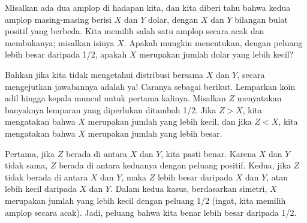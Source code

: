 \begin{example}\label{exam 4.3.6}
Misalkan ada dua amplop di hadapan kita, dan kita diberi tahu bahwa
kedua amplop masing-masing berisi $X$ dan $Y$ dolar, dengan $X$ dan $Y$ bilangan bulat
positif yang berbeda.  Kita memilih salah satu amplop secara acak dan membukanya;
misalkan isinya $X$.  Apakah mungkin menentukan, dengan peluang lebih besar daripada
1/2, apakah $X$ merupakan jumlah dolar yang lebih kecil?
\par
Bahkan jika kita tidak mengetahui distribusi bersama $X$ dan $Y$, secara mengejutkan
jawabannya adalah ya!  Caranya sebagai berikut.  Lemparkan koin adil hingga kepala
muncul untuk pertama kalinya.  Misalkan $Z$ menyatakan banyaknya lemparan yang
diperlukan ditambah 1/2.  Jika $Z > X$, kita mengatakan bahwa $X$ merupakan jumlah
yang lebih kecil, dan jika $Z < X$, kita mengatakan bahwa $X$ merupakan jumlah yang
lebih besar.
\par
Pertama, jika $Z$ berada di antara $X$ dan $Y$, kita pasti benar.  Karena $X$ dan $Y$
tidak sama, $Z$ berada di antara keduanya dengan peluang positif.  Kedua, jika $Z$
tidak berada di antara $X$ dan $Y$, maka $Z$ lebih besar daripada $X$ dan $Y$, atau
lebih kecil daripada $X$ dan $Y$.  Dalam kedua kasus, berdasarkan simetri, $X$ merupakan
jumlah yang lebih kecil dengan peluang 1/2 (ingat, kita memilih amplop secara acak).
Jadi, peluang bahwa kita benar lebih besar daripada 1/2.
\end{example}

